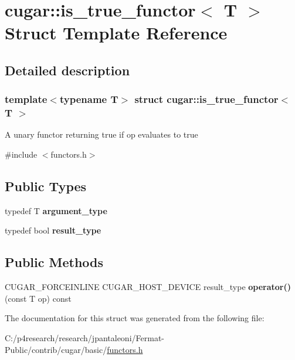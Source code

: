 \hypertarget{structcugar_1_1is__true__functor}{}\section{cugar\+:\+:is\+\_\+true\+\_\+functor$<$ T $>$ Struct Template Reference}
\label{structcugar_1_1is__true__functor}


\subsection{Detailed description}
\subsubsection*{template$<$typename T$>$\newline
struct cugar\+::is\+\_\+true\+\_\+functor$<$ T $>$}

A unary functor returning true if op evaluates to true 

{\ttfamily \#include $<$functors.\+h$>$}

\subsection*{Public Types}
\begin{DoxyCompactItemize}
\item 
\mbox{\label{structcugar_1_1is__true__functor_aebaa3a31bf4ac78b6789dfdb9b9b9a3a}} 
typedef T {\bfseries argument\+\_\+type}
\item 
\mbox{\label{structcugar_1_1is__true__functor_a9ebf7905fa931cdb25534aff5c6bd90d}} 
typedef bool {\bfseries result\+\_\+type}
\end{DoxyCompactItemize}
\subsection*{Public Methods}
\begin{DoxyCompactItemize}
\item 
\mbox{\label{structcugar_1_1is__true__functor_abd3cbe1802a5c1b1668b0c2c4e0d99f6}} 
C\+U\+G\+A\+R\+\_\+\+F\+O\+R\+C\+E\+I\+N\+L\+I\+NE C\+U\+G\+A\+R\+\_\+\+H\+O\+S\+T\+\_\+\+D\+E\+V\+I\+CE result\+\_\+type {\bfseries operator()} (const T op) const
\end{DoxyCompactItemize}


The documentation for this struct was generated from the following file\+:\begin{DoxyCompactItemize}
\item 
C\+:/p4research/research/jpantaleoni/\+Fermat-\/\+Public/contrib/cugar/basic/\hyperlink{functors_8h}{functors.\+h}\end{DoxyCompactItemize}
